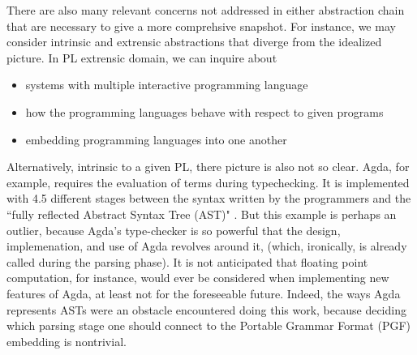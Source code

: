 There are also many relevant concerns not addressed in either abstraction chain
that are necessary to give a more comprehsive snapshot. For instance, we may
consider intrinsic and extrensic abstractions that diverge from the idealized
picture. In PL extrensic domain, we can inquire about 

\begin{itemize}

\item systems with multiple interactive programming language 
\item how the programming languages behave with respect to given programs
\item embedding programming languages into one another

\end{itemize}

Alternatively, intrinsic to a given PL, there picture is also not so clear.
Agda, for example, requires the evaluation of terms during typechecking. It is
implemented with 4.5 different stages between the syntax written by the
programmers and the ``fully reflected Abstract Syntax Tree (AST)" \cite{andreasEmail}. But this
example is perhaps an outlier, because Agda's type-checker is so powerful that
the design, implemenation, and use of Agda revolves around it,
(which, ironically, is already called during the parsing phase). It is not
anticipated that floating point computation, for instance, would ever be
considered when implementing new features of Agda, at least not for the
foreseeable future. Indeed, the ways Agda represents ASTs were an obstacle
encountered doing this work, because deciding which parsing stage one should connect
to the Portable Grammar Format (PGF) embedding is nontrivial.



